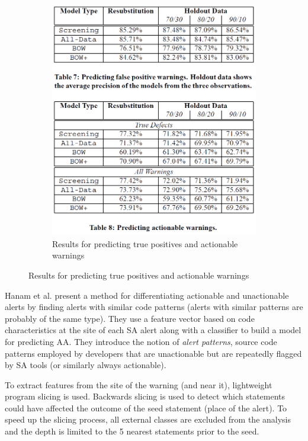 \begin{figure}[H]
\begin{subfigure}{.5\textwidth}
         \includegraphics[scale=0.3]{./src/actionable_warnings_results.png}
         \caption{Results for predicting true positives and actionable warnings}\label{act:results}
     \end{subfigure}
 \end{figure}


 Hanam et al. \cite{alert_patterns} present a method for differentiating actionable and unactionable alerts by finding alerts with similar code patterns (alerts with similar patterns are probably of the same type). They use a feature vector based on code characteristics at the site of each SA alert along with a classifier to build a model for predicting AA. They introduce the notion of \textit{alert patterns}, source code patterns employed by developers that are unactionable but are repeatedly flagged by SA tools (or similarly always actionable).

 To extract features from the site of the warning (and near it), lightweight program slicing is used. Backwards slicing is used to detect which statements could have affected the outcome of the seed statement (place of the alert). To speed up the slicing process, all external classes are excluded from the analysis and the depth is limited to the 5 nearest statements prior to the seed.

